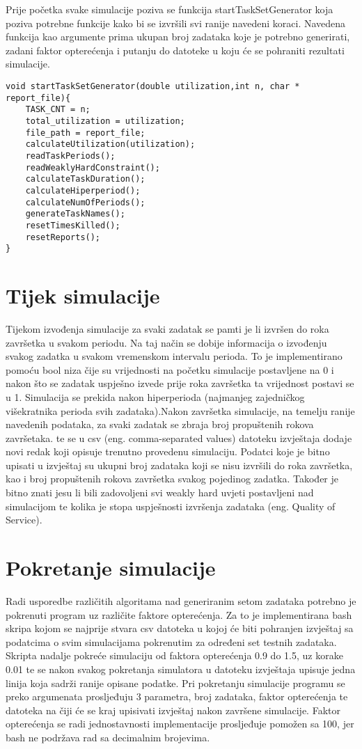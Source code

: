 \documentclass[../zavrsni.tex]{subfiles}
\begin{document}
Prije početka svake simulacije poziva se funkcija startTaskSetGenerator koja poziva potrebne funkcije kako bi se izvršili 
svi ranije navedeni koraci. Navedena funkcija kao argumente prima ukupan broj zadataka koje je potrebno generirati, zadani 
faktor opterećenja i putanju do datoteke u koju će se pohraniti rezultati simulacije.
\begin{lstlisting}[style=CStyle,caption={Funckija startTaskSetGenerator},captionpos=b]
void startTaskSetGenerator(double utilization,int n, char * report_file){
    TASK_CNT = n; 
    total_utilization = utilization; 
    file_path = report_file;
    calculateUtilization(utilization);
    readTaskPeriods();
    readWeaklyHardConstraint();
    calculateTaskDuration();
    calculateHiperperiod();
    calculateNumOfPeriods();
    generateTaskNames();
    resetTimesKilled();
    resetReports();
}
\end{lstlisting}
\section{Tijek simulacije}

Tijekom izvođenja simulacije za svaki zadatak se pamti je li izvršen do roka završetka u svakom periodu. 
Na taj način se dobije informacija o izvođenju svakog zadatka u svakom vremenskom intervalu perioda. To je implementirano 
pomoću bool niza čije su vrijednosti na početku simulacije postavljene na 0 i nakon što se zadatak uspješno izvede 
prije roka završetka ta vrijednost postavi se u 1. Simulacija se prekida nakon hiperperioda (najmanjeg zajedničkog višekratnika perioda 
svih zadataka).Nakon završetka simulacije, na temelju ranije navedenih podataka, za svaki zadatak se zbraja broj propuštenih rokova završetaka.
te se u csv (eng. comma-separated values) datoteku izvještaja dodaje novi redak koji opisuje trenutno provedenu simulaciju. 
Podatci koje je bitno upisati u izvještaj su ukupni broj zadataka koji se nisu izvršili do roka završetka, kao i broj propuštenih rokova 
završetka svakog pojedinog zadatka. Također je bitno znati jesu li bili zadovoljeni svi weakly hard uvjeti 
postavljeni nad simulacijom te kolika je stopa uspješnosti izvršenja zadataka (eng. Quality of Service). 

\section{Pokretanje simulacije}

Radi usporedbe različitih algoritama nad generiranim setom zadataka potrebno je pokrenuti program uz različite faktore opterećenja. 
Za to je implementirana bash skripa kojom se najprije stvara csv datoteka u kojoj će biti pohranjen izvještaj sa podatcima o 
svim simulacijama pokrenutim za određeni set testnih zadataka. 
Skripta nadalje pokreće simulaciju od faktora opterećenja 0.9 do 1.5, uz korake 0.01 te se nakon svakog pokretanja simulatora u 
datoteku izvještaja upisuje jedna linija koja sadrži ranije opisane podatke.
Pri pokretanju simulacije programu se preko argumenata prosljeđuju 3 parametra, broj zadataka, 
faktor opterećenja te datoteka na čiji će se kraj upisivati izvještaj nakon završene simulacije.
Faktor opterećenja se radi jednostavnosti implementacije prosljeđuje pomožen sa 100, jer bash ne podržava rad sa decimalnim brojevima.
\end{document}
